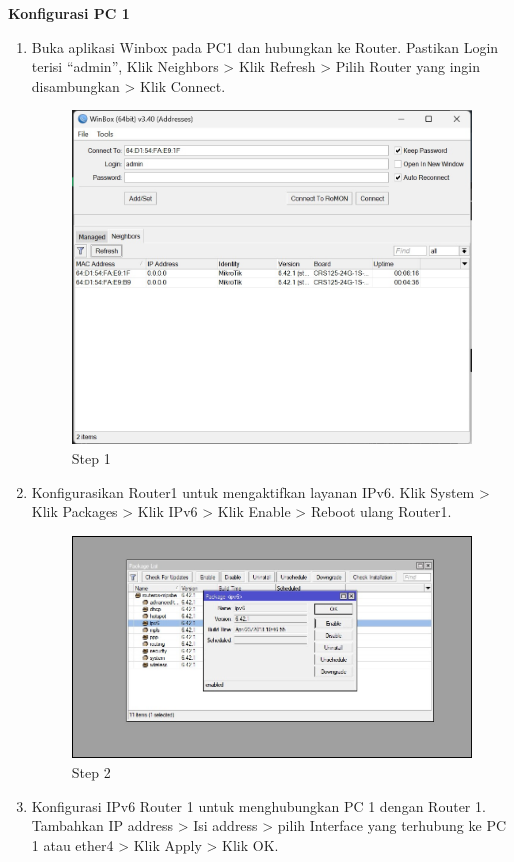 \begin{center} 
	\textbf{Konfigurasi PC 1}
\end{center}

\begin{enumerate}
	\item Buka aplikasi Winbox pada PC1 dan hubungkan ke Router. Pastikan Login terisi “admin”, Klik
	Neighbors > Klik Refresh > Pilih Router yang ingin disambungkan > Klik Connect.
	
	\begin{figure}[H]
		\centering
		\includegraphics[width=0.7\linewidth]{P5/img/step1.jpg}
		\caption{Step 1}
		\label{fig:gambar1}
	\end{figure}

	\item Konfigurasikan Router1 untuk mengaktifkan layanan IPv6. Klik System > Klik Packages > Klik
	IPv6 > Klik Enable > Reboot ulang Router1.
	
	\begin{figure}[H]
		\centering
		\includegraphics[width=0.7\linewidth]{P5/img/step2.jpg}
		\caption{Step 2}
		\label{fig:gambar1}
	\end{figure}

	\item Konfigurasi IPv6 Router 1 untuk menghubungkan PC 1 dengan Router 1. Tambahkan IP address
	> Isi address > pilih Interface yang terhubung ke PC 1 atau ether4 > Klik Apply > Klik OK.
	

\end{enumerate}
